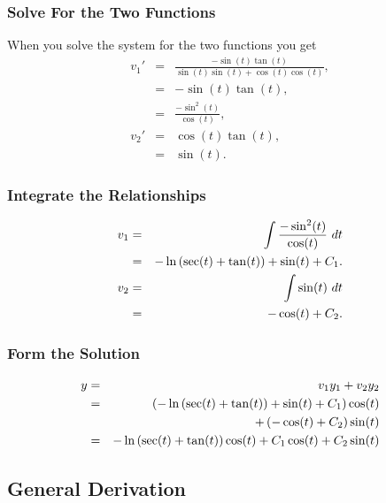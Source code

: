 \begin{frame}
  \frametitle{Solve For the Two Functions}

  When you solve the system for the two functions you get
  \begin{eqnarray*}
    v_1' & = & \frac{-\sin(t)\tan(t)}{\sin(t)\sin(t)+\cos(t)\cos(t)}, \\
    & = & -\sin(t)\tan(t), \\
    & = & \frac{-\sin^2(t)}{\cos(t)}, \\
    v_2' & = & \cos(t)\tan(t), \\
    & = & \sin(t).
  \end{eqnarray*}

\end{frame}


\begin{frame}
  \frametitle{Integrate the Relationships}

  \begin{eqnarray*}
    v_1 & = & \int \frac{-\sin^2(t)}{\cos(t)} ~ dt \\
    & = & -\ln\left(\sec(t)+\tan(t)\right) + \sin(t) + C_1. \\
    v_2 & = & \int \sin(t) ~ dt \\ 
    & = & -\cos(t) + C_2.
  \end{eqnarray*}

\end{frame}


\begin{frame}
  \frametitle{Form the Solution}

  \begin{eqnarray*}
    y & = & v_1 y_1 + v_2 y_2 \\
    & = & \left( -\ln\left(\sec(t)+\tan(t)\right) + \sin(t) + C_1 \right) \cos(t) \\
    & & 
    + \left( -\cos(t) + C_2 \right) \sin(t) \\
    & = & - \ln\left(\sec(t)+\tan(t)\right) \cos(t) + C_1 \cos(t) + C_2 \sin(t)
  \end{eqnarray*}

\end{frame}

\subsection{General Derivation}

